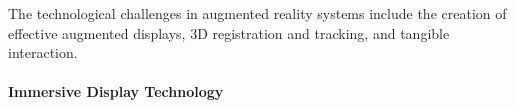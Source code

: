 \documentclass[10pt,twocolumn,letterpaper]{article}
\begin{document}


The technological challenges in augmented reality systems
include the creation of effective augmented displays, 3D
registration and tracking, and tangible interaction.



\vspace{-0.15in}
\paragraph{Immersive Display Technology} 
\end{document}
